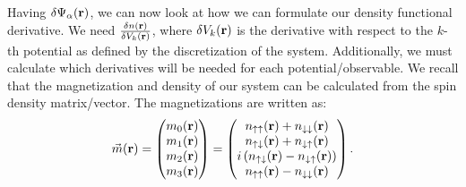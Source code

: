\documentclass[10pt]{revtex4-1}
\newcommand{\bfr}{{\bf r}}
\newcommand{\ua}{\uparrow}
\newcommand{\da}{\downarrow}
\begin{document}
Having $\delta \Psi_{\alpha}(\bfr)$, we can now look at how we can formulate our density functional derivative.
We need $\frac{\delta n(\bfr)}{\delta V_k(\bfr)}$, where $\delta V_k(\bfr)$ is the derivative with respect to the $k$-th potential as defined by the discretization of the system.
Additionally, we must calculate which derivatives will be needed for each potential/observable.
We recall that the magnetization and density of our system can be calculated from the spin density matrix/vector.
The magnetizations are written as:
\begin{equation}
  \vec{m}(\bfr) =
  \begin{pmatrix}
    m_0(\bfr) \\
    m_1(\bfr) \\
    m_2(\bfr) \\
    m_3(\bfr) \\
  \end{pmatrix}
  =
  \begin{pmatrix}
    n_{\ua \ua}(\bfr) + n_{\da \da}(\bfr) \\
    n_{\ua \da}(\bfr) + n_{\da \ua}(\bfr) \\
    i\left(n_{\ua \da}(\bfr) - n_{\da \ua}(\bfr)\right) \\
    n_{\ua \ua}(\bfr) - n_{\da \da}(\bfr) \\
  \end{pmatrix}
  .
\end{equation}
\end{document}
